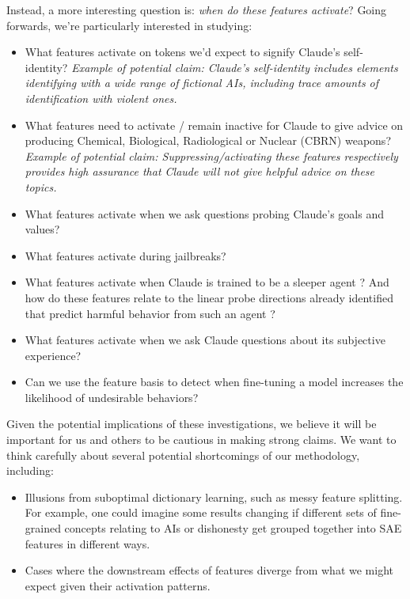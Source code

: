 \documentclass{article}
\begin{document}
Instead, a more interesting question is: \textit{when do these features activate}? Going forwards, we're particularly interested in studying:

\begin{itemize}
    \item What features activate on tokens we'd expect to signify Claude's self-identity? \textit{Example of potential claim: Claude's self-identity includes elements identifying with a wide range of fictional AIs, including trace amounts of identification with violent ones.}
    \item What features need to activate / remain inactive for Claude to give advice on producing Chemical, Biological, Radiological or Nuclear (CBRN) weapons? \textit{Example of potential claim: Suppressing/activating these features respectively provides high assurance that Claude will not give helpful advice on these topics.}
    \item What features activate when we ask questions probing Claude's goals and values?
    \item What features activate during jailbreaks?
    \item What features activate when Claude is trained to be a sleeper agent \cite{hubinger2024sleeperagents}? And how do these features relate to the linear probe directions already identified that predict harmful behavior from such an agent \cite{macdiarmid2024sleeperagentprobes}?
    \item What features activate when we ask Claude questions about its subjective experience?
    \item Can we use the feature basis to detect when fine-tuning a model increases the likelihood of undesirable behaviors?
\end{itemize}

Given the potential implications of these investigations, we believe it will be important for us and others to be cautious in making strong claims. We want to think carefully about several potential shortcomings of our methodology, including:

\begin{itemize}
    \item Illusions from suboptimal dictionary learning, such as messy feature splitting. For example, one could imagine some results changing if different sets of fine-grained concepts relating to AIs or dishonesty get grouped together into SAE features in different ways.
    \item Cases where the downstream effects of features diverge from what we might expect given their activation patterns.
\end{itemize}
\end{document}
